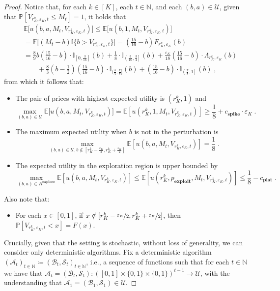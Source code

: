 \documentclass[final,12pt]{colt2025}
\newcommand{\cA}{\mathcal{A}}
\newcommand{\cB}{\mathcal{B}}
\newcommand{\cS}{\mathcal{S}}
\newcommand{\cU}{\mathcal{U}}
\newcommand{\E}{\mathbb{E}}
\newcommand{\I}{\mathbb{I}}
\newcommand{\N}{\mathbb{N}}
\newcommand{\Pb}{\mathbb{P}}
\newcommand{\e}{\varepsilon}
\newcommand{\lrb}[1]{\left(#1\right)}
\newcommand{\lsb}[1]{\left[#1\right]}
\newcommand{\bsb}[1]{\bigl[#1\bigr]}
\newcommand{\one}[1]{\mathbb{I}\{#1\}}
\newcommand{\util}{u}
\newcommand{\itemm}{\item[$\bullet$]}
\newcommand{\nP}{M}
\newcommand{\nZ}{V}
\newcommand{\ncB}{\cB}
\newcommand{\nb}{b}
\newcommand{\ncS}{\cS}
\newcommand{\ns}{a}
\begin{document}
{\begin{proof}
Notice that, for each $k \in [K]$, each $t \in \N$, and each $(\nb, \ns) \in \cU$, given that $\Pb [ \nZ_{r_K^k,\e_K,t} \le \nP_t ] = 1$, it holds that
\begin{align*}
&
    \E\bsb{\util(\nb,\ns,\nP_t,\nZ_{r_K^k,\e_K,t})}
\le
    \E\bsb{\util(\nb,1,\nP_t,\nZ_{r_K^k,\e_K,t})}
\\ &
=
    \E\bsb{(\nP_t - \nb) \one{\nb > \nZ_{r_K^k,\e_K,t}}}
=
    \lrb{\frac{15}{16} - \nb}F_{r_K^k,\e_K}(\nb)
\\ &
=
    \frac{8}{9}\nb\lrb{\frac{15}{16}-b} \cdot \I_{\left[0, \frac{3}{16}\right]}(\nb) 
+   
    \frac{1}{8}\cdot \I_{\left(\frac{3}{16},\frac{3}{4}\right]}(\nb)
+
    \frac{\e_K}{18} \lrb{\frac{15}{16} - \nb} \cdot \Lambda_{r_K^k,\e_K}(\nb)
\\ & \qquad
+
    \frac{8}{3} \lrb{\nb - \frac{1}{2}} \lrb{\frac{15}{16} - \nb} \cdot \I_{(\frac{3}{4},\frac{7}{8}]}(\nb)
+
    \lrb{\frac{15}{16} - \nb} \cdot \I_{\left(\frac{7}{8}, 1\right]}(\nb)\;,
\end{align*}
from which it follows that:
\begin{itemize}
    \itemm The pair of prices with highest expected utility is $(r_K^k, 1)$ and
    $$
        \max_{(\nb, \ns) \in \cU} \E\bsb{\util(\nb,\ns,\nP_t, \nZ_{r_K^k,\e_K,t})} = \E\lsb{\util\lrb{r_K^k,1,\nP_t,\nZ_{r_K^k,\e_K,t}}} \ge \frac{1}{8} + c_{\textbf{spike}} \cdot \e_K \;.
    $$
    \itemm The maximum expected utility when $\nb$ is not in the perturbation is
    $$
        \max_{
            (\nb,\ns) \in \cU,
            \nb \notin [r_K^k-\frac{\e_K}{2}, r_K^k+\frac{\e_K}{2}]
        }
        \E \lsb{ \util(\nb, \ns, \nP_t, \nZ_{r_K^k, \e_K,t}) }
        = \frac{1}{8}
        \; .
    $$
    \itemm The expected utility in the exploration region is upper bounded by
    $$
        \max_{(\nb, \ns) \in R^{\textbf{explore}}}
        \E\lsb{\util(\nb,\ns,\nP_t,\nZ_{r_K^k,\e_K,t})}
        \le \E\lsb{\util(r_K^k, p_\textbf{exploit}, \nP_t, \nZ_{r_K^k,\e_K,t})}
        \le \frac{1}{8} - c_{\textbf{plat}}
        \;.
    $$
\end{itemize}
Also note that:
\begin{itemize}
    \itemm For each $x \in [0,1]$, if $x \notin [r_K^k-\nicefrac{\e_K}{2},r_K^k+\nicefrac{\e_K}{2}]$, then $\Pb[\nZ_{r_K^k,\e_K,t}<x] = F(x)$.
\end{itemize}
Crucially, given that the setting is stochastic, without loss of generality, we can consider only deterministic algorithms.
Fix a deterministic algorithm $(\cA_t)_{t \in \N} \coloneqq (\ncB_t,\ncS_t)_{t \in \N}$, i.e., a sequence of functions such that for each $t \in \N$ we have that $\cA_t = (\ncB_{t},\ncS_{t}) \colon ([0,1] \times \{0,1\} \times \{0,1\})^{t-1} \to \cU$, with the understanding that $\cA_1 = (\ncB_1,\ncS_1) \in \cU$.

\end{proof}}
\end{document}
